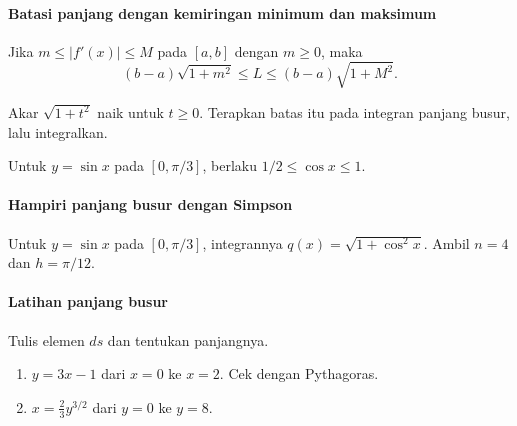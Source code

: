 \documentclass{../../kalkulus-ppt}
\begin{document}
\begin{frame}{\insertsection}
    \framesubtitle{Batasi panjang dengan kemiringan minimum dan maksimum}
    \begin{teorema}
        Jika $m\le |f'(x)|\le M$ pada $[a,b]$ dengan $m\ge0$, maka
        \[
            (b-a)\sqrt{1+m^2}\le L\le(b-a)\sqrt{1+M^2}.
        \]
    \end{teorema}
    Akar $\sqrt{1+t^2}$ naik untuk $t\ge0$. Terapkan batas itu pada
    integran panjang busur, lalu integralkan.
    \begin{contoh}
        Untuk $y=\sin x$ pada $[0,\pi/3]$, berlaku
        $1/2\le\cos x\le1$.
    \end{contoh}
\end{frame}

\begin{frame}{\insertsection}
    \framesubtitle{Hampiri panjang busur dengan Simpson}
    Untuk $y=\sin x$ pada $[0,\pi/3]$, integrannya
    $q(x)=\sqrt{1+\cos^2x}$. Ambil $n=4$ dan $h=\pi/12$.
\end{frame}

\begin{frame}{\insertsection}
    \framesubtitle{Latihan panjang busur}
    \begin{latihan}
        Tulis elemen $ds$ dan tentukan panjangnya.
        \begin{enumerate}
            \item $y=3x-1$ dari $x=0$ ke $x=2$. Cek dengan Pythagoras.
            \item $x=\tfrac23 y^{3/2}$ dari $y=0$ ke $y=8$.
        \end{enumerate}
    \end{latihan}
\end{frame}
\end{document}
